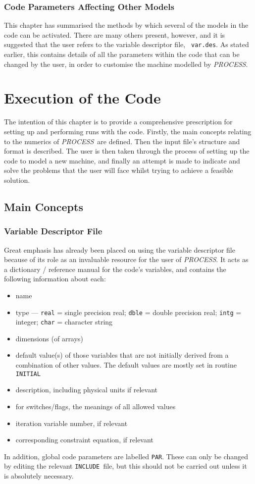 \documentclass[11pt,a4paper]{report}
\makeatletter
\newcommand{\PS}{\mbox{\it PROCESS\/ }}
\newcommand{\PSD}{\mbox{\it PROCESS}\@.\/ }
\newcommand{\INCLUDE}{\mbox{\tt INCLUDE }}
\newcommand{\setheader}[1]
 {\markright{\rlap{\lower0.8ex\hbox to\textwidth{\hrulefill}}{\bf#1}}}
\newcommand{\mychapter}[1]{\small\normalsize
 \setcounter{footnote}{0}
 \chapter{#1}
 \pagestyle{myheadings}
 \setheader{Chapter \thechapter\hspace{0.8em}#1}}
\makeatother
\begin{document}
\subsection{Code Parameters Affecting Other Models}

This chapter has summarised the methods by which several of the models in the
code can be activated. There are many others present, however, and it is
suggested that the user refers to the variable descriptor file, {\tt
var.des}. As stated earlier, this contains details of all the parameters
within the code that can be changed by the user, in order to customise the
machine modelled by \PSD

\setlength{\parskip}{5mm}

\mychapter{Execution of the Code}
\label{chap:run}

The intention of this chapter is to provide a comprehensive prescription for
setting up and performing runs with the code.  Firstly, the main concepts
relating to the numerics of \PS are defined. Then the input file's structure
and format is described. The user is then taken through the process of setting
up the code to model a new machine, and finally an attempt is made to indicate
and solve the problems that the user will face whilst trying to achieve a
feasible solution.

\section{Main Concepts}

\subsection{Variable Descriptor File}

Great emphasis has already been placed on using the variable descriptor file
because of its role as an invaluable resource for the user of \PSD It acts as
a dictionary / reference manual for the code's variables, and contains the
following information about each:
\begin{itemize}
\item name
\item
type --- {\tt real} = single precision real; {\tt dble} = double precision
real; {\tt intg} = integer; {\tt char} = character string
\item
dimensions (of arrays)
\item
default value(s) of those variables that are not initially derived from a
combination of other values. The default values are mostly set in routine {\tt
INITIAL}
\item
description, including physical units if relevant
\item
for switches/flags, the meanings of all allowed values
\item
iteration variable number, if relevant
\item
corresponding constraint equation, if relevant
\end{itemize}
In addition, global code parameters are labelled {\tt PAR}. These can only be
changed by editing the relevant \INCLUDE file, but this should not be carried
out unless it is absolutely necessary.
\end{document}
